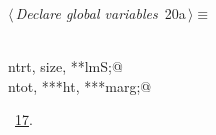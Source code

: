 \documentclass[reqno]{amsart}
\renewcommand{\NWtarget}[2]{\hypertarget{#1}{#2}}
\renewcommand{\NWlink}[2]{\hyperlink{#1}{#2}}
\begin{document}
\begin{flushleft} \small\label{scrap32}\raggedright\small
\NWtarget{nuweb20a}{} $\langle\,${\itshape Declare global variables}\nobreak\ {\footnotesize {20a}}$\,\rangle\equiv$
\vspace{-1ex}
\begin{list}{}{} \item
\mbox{}\verb@@\\
\mbox{}\verb@int ntrt, size, **lmS;@\\
\mbox{}\verb@double ntot, ***ht, ***marg;@\\
\mbox{}\verb@@{\NWsep}
\end{list}
\vspace{-1.5ex}
\footnotesize
\begin{list}{}{\setlength{\itemsep}{-\parsep}\setlength{\itemindent}{-\leftmargin}}
\item \NWtxtMacroRefIn\ \NWlink{nuweb17}{17}.

\item{}
\end{list}
\vspace{4ex}
\end{flushleft}
\end{document}
